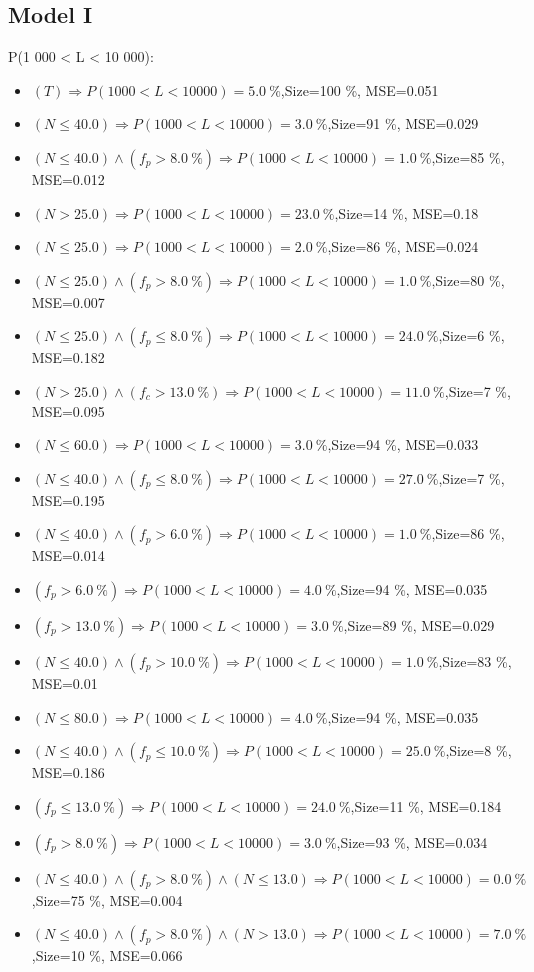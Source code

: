 \documentclass[numbered]{CSL}
\begin{document}
\subsection{Model I}
P(1 000 < L < 10 000):
\begin{itemize}
\item $(T) \Rightarrow P(1 000 < L < 10 000) = 5.0~\%$,\hfill Size=100 \%, MSE=0.051
\item $(N \leq 40.0) \Rightarrow P(1 000 < L < 10 000) = 3.0~\%$,\hfill Size=91 \%, MSE=0.029
\item $(N \leq 40.0) \land (f_p > 8.0~\%) \Rightarrow P(1 000 < L < 10 000) = 1.0~\%$,\hfill Size=85 \%, MSE=0.012
\item $(N > 25.0) \Rightarrow P(1 000 < L < 10 000) = 23.0~\%$,\hfill Size=14 \%, MSE=0.18
\item $(N \leq 25.0) \Rightarrow P(1 000 < L < 10 000) = 2.0~\%$,\hfill Size=86 \%, MSE=0.024
\item $(N \leq 25.0) \land (f_p > 8.0~\%) \Rightarrow P(1 000 < L < 10 000) = 1.0~\%$,\hfill Size=80 \%, MSE=0.007
\item $(N \leq 25.0) \land (f_p \leq 8.0~\%) \Rightarrow P(1 000 < L < 10 000) = 24.0~\%$,\hfill Size=6 \%, MSE=0.182
\item $(N > 25.0) \land (f_c > 13.0~\%) \Rightarrow P(1 000 < L < 10 000) = 11.0~\%$,\hfill Size=7 \%, MSE=0.095
\item $(N \leq 60.0) \Rightarrow P(1 000 < L < 10 000) = 3.0~\%$,\hfill Size=94 \%, MSE=0.033
\item $(N \leq 40.0) \land (f_p \leq 8.0~\%) \Rightarrow P(1 000 < L < 10 000) = 27.0~\%$,\hfill Size=7 \%, MSE=0.195
\item $(N \leq 40.0) \land (f_p > 6.0~\%) \Rightarrow P(1 000 < L < 10 000) = 1.0~\%$,\hfill Size=86 \%, MSE=0.014
\item $(f_p > 6.0~\%) \Rightarrow P(1 000 < L < 10 000) = 4.0~\%$,\hfill Size=94 \%, MSE=0.035
\item $(f_p > 13.0~\%) \Rightarrow P(1 000 < L < 10 000) = 3.0~\%$,\hfill Size=89 \%, MSE=0.029
\item $(N \leq 40.0) \land (f_p > 10.0~\%) \Rightarrow P(1 000 < L < 10 000) = 1.0~\%$,\hfill Size=83 \%, MSE=0.01
\item $(N \leq 80.0) \Rightarrow P(1 000 < L < 10 000) = 4.0~\%$,\hfill Size=94 \%, MSE=0.035
\item $(N \leq 40.0) \land (f_p \leq 10.0~\%) \Rightarrow P(1 000 < L < 10 000) = 25.0~\%$,\hfill Size=8 \%, MSE=0.186
\item $(f_p \leq 13.0~\%) \Rightarrow P(1 000 < L < 10 000) = 24.0~\%$,\hfill Size=11 \%, MSE=0.184
\item $(f_p > 8.0~\%) \Rightarrow P(1 000 < L < 10 000) = 3.0~\%$,\hfill Size=93 \%, MSE=0.034
\item $(N \leq 40.0) \land (f_p > 8.0~\%) \land (N \leq 13.0) \Rightarrow P(1 000 < L < 10 000) = 0.0~\%$,\hfill Size=75 \%, MSE=0.004
\item $(N \leq 40.0) \land (f_p > 8.0~\%) \land (N > 13.0) \Rightarrow P(1 000 < L < 10 000) = 7.0~\%$,\hfill Size=10 \%, MSE=0.066
\end{itemize}
\end{document}
